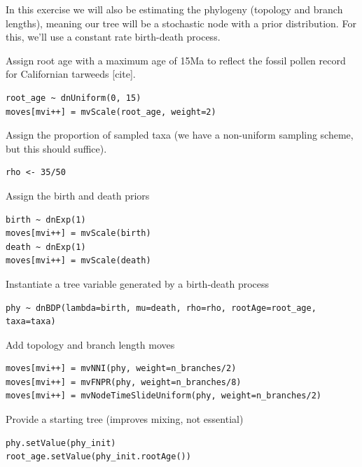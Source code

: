 In this exercise we will also be estimating the phylogeny (topology and branch lengths), meaning our tree will be a stochastic node with a prior distribution.
For this, we'll use a constant rate birth-death process.

Assign root age with a maximum age of 15Ma to reflect the fossil pollen record for Californian tarweeds [cite].

\begin{snugshade}
\begin{lstlisting}
root_age ~ dnUniform(0, 15)
moves[mvi++] = mvScale(root_age, weight=2)
\end{lstlisting}
\end{snugshade}

Assign the proportion of sampled taxa (we have a non-uniform sampling scheme, but this should suffice).
\begin{snugshade}
\begin{lstlisting}
rho <- 35/50
\end{lstlisting}
\end{snugshade}

Assign the birth and death priors
\begin{snugshade}
\begin{lstlisting}
birth ~ dnExp(1)
moves[mvi++] = mvScale(birth)
death ~ dnExp(1)
moves[mvi++] = mvScale(death)
\end{lstlisting}
\end{snugshade}

Instantiate a tree variable generated by a birth-death process
\begin{snugshade}
\begin{lstlisting}
phy ~ dnBDP(lambda=birth, mu=death, rho=rho, rootAge=root_age, taxa=taxa)
\end{lstlisting}
\end{snugshade}


Add topology and branch length moves
\begin{snugshade}
\begin{lstlisting}
moves[mvi++] = mvNNI(phy, weight=n_branches/2)
moves[mvi++] = mvFNPR(phy, weight=n_branches/8)
moves[mvi++] = mvNodeTimeSlideUniform(phy, weight=n_branches/2)
\end{lstlisting}
\end{snugshade}

Provide a starting tree (improves mixing, not essential)

\begin{snugshade}
\begin{lstlisting}
phy.setValue(phy_init)
root_age.setValue(phy_init.rootAge())
\end{lstlisting}
\end{snugshade}


